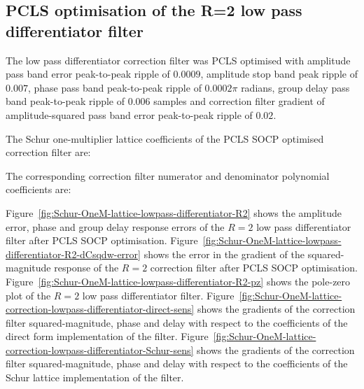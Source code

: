\documentclass[a4paper,twoside,10pt,english]{article}
\begin{document}
\subsection{PCLS optimisation of the R=2 low pass differentiator filter}
The low pass differentiator correction filter was PCLS optimised with 
amplitude pass band error peak-to-peak ripple of $0.0009$,
amplitude stop band peak ripple of $0.007$,
phase pass band peak-to-peak ripple of $0.0002\pi$\; radians,
group delay pass band peak-to-peak ripple of $0.006$\; samples and
correction filter gradient of amplitude-squared pass band error peak-to-peak
ripple of $0.02$.

The Schur one-multiplier lattice coefficients of the PCLS SOCP optimised
correction filter are:
\begin{small}



\end{small}

The corresponding correction filter numerator and denominator polynomial
coefficients are:
\begin{small}


\end{small}
Figure~\ref{fig:Schur-OneM-lattice-lowpass-differentiator-R2}
shows the  amplitude error, phase and group delay response errors of the $R=2$
low pass differentiator filter after PCLS SOCP optimisation.
Figure~\ref{fig:Schur-OneM-lattice-lowpass-differentiator-R2-dCsqdw-error}
shows the error in the gradient of the squared-magnitude response of the $R=2$
correction filter after PCLS SOCP optimisation.
Figure~\ref{fig:Schur-OneM-lattice-lowpass-differentiator-R2-pz} shows
the pole-zero plot of the $R=2$ low pass differentiator filter.
Figure~\ref{fig:Schur-OneM-lattice-correction-lowpass-differentiator-direct-sens}
shows the gradients of the correction filter squared-magnitude, phase and delay
with respect to the coefficients of the direct form implementation of the filter.
Figure~\ref{fig:Schur-OneM-lattice-correction-lowpass-differentiator-Schur-sens}
shows the gradients of the correction filter squared-magnitude, phase and delay
with respect to the coefficients of the Schur lattice implementation of the
filter.
\end{document}
